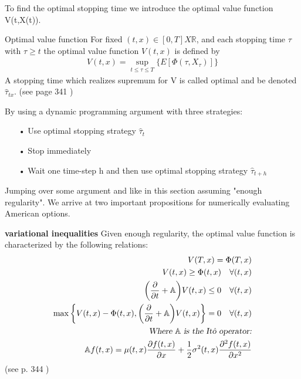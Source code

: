 To find the optimal stopping time we introduce the optimal value function V(t,X(t)).
\theoremstyle{definition}
\begin{definition}{Optimal value function }\label{optValFunc}
For fixed $(t,x)\in [0,T]X\mathbb{R}$, and each stopping time $\tau$ with $\tau\geq t$ the optimal value function $V(t,x)$ is defined by
\begin{align}
V(t,x)=\sup_{t \leq \tau\leq T}\{E[\Phi(\tau,X_{\tau})]\}
\end{align}
A stopping time which realizes supremum for V is called optimal and be denoted $\hat{\tau}_{tx}$.
(see page 341 \parencite{finKont})
\end{definition}
By using a dynamic programming argument with three strategies:
\begin{enumerate}
\item[•] Use optimal stopping strategy $\hat{\tau}_t$
\item[•] Stop immediately
\item[•] Wait one time-step h and then use optimal stopping strategy $\hat{\tau}_{t+h}$
\end{enumerate}
Jumping over some argument and like in this section assuming "enough regularity". We arrive at two important propositions for numerically evaluating American options.

\begin{proposition}{\textbf{variational inequalities}}\label{varInEq}
Given enough regularity, the optimal value function is characterized by the following relations:
\begin{equation}
\begin{split}
V(T,x)=\Phi(T,x)\\
V(t,x)\geq \Phi(t,x) \quad \forall (t,x)\\
\bigg(\frac{\partial}{\partial t} + \mathbb{A}\bigg)V(t,x) \leq 0 \quad \forall (t,x)\\
\max\bigg\{V(t,x) - \Phi(t,x), \bigg(\frac{\partial}{\partial t} + \mathbb{A}\bigg)V(t,x) \bigg\} = 0 \quad \forall (t,x)\\
\textsl{Where $\mathbb{A}$ is the Itô operator:}\\
\mathbb{A}f(t,x) =  \mu(t,x) \frac{\partial f(t,x)}{\partial x} + \frac{1}{2} \sigma^2(t,x) \frac{\partial^2 f(t,x)}{\partial x^2}
\end{split}
\end{equation}
(see p. 344 \parencite{finKont})
\end{proposition}

